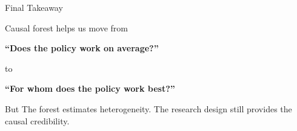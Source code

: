 \documentclass[hyperref={pdfpagelabels=false}]{beamer}
\begin{document}
\begin{frame}{Final Takeaway}
\begin{center}
\large
Causal forest helps us move from

\vspace{0.25cm}
\textbf{``Does the policy work on average?''}

\vspace{0.25cm}
to

\vspace{0.25cm}
\textbf{``For whom does the policy work best?''}
\end{center}

\vspace{0.3cm}
\begin{block}{But}
The forest estimates heterogeneity. The research design still provides the causal credibility.
\end{block}
\end{frame}
\end{document}
